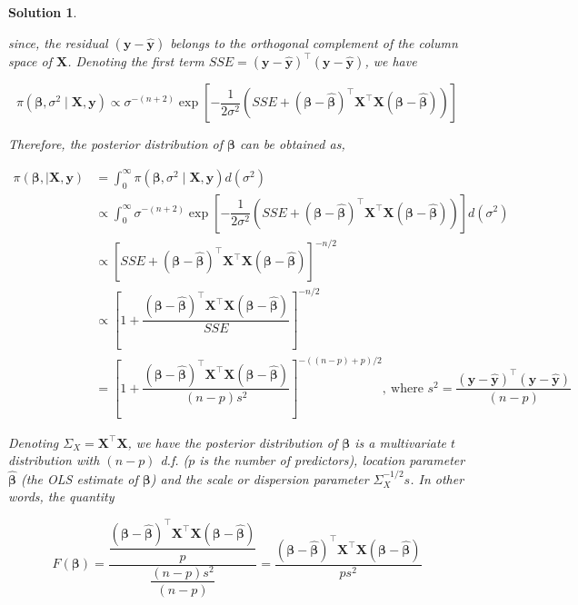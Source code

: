 \documentclass[12pt]{article}
\theoremstyle{problemstyle}
\newtheorem*{solution*}{Solution}
\newcommand{\bb}[1]{\boldsymbol{#1}}
\newcommand{\transpose}{^\intercal}
\begin{document}
\begin{solution*}
\begin{enumerate}
        since, the residual $(\bb{y} - \widehat{\bb{y}})$ belongs to the orthogonal complement of the column space of $\bb{X}$. Denoting the first term $SSE = (\bb{y} - \widehat{\bb{y}})\transpose (\bb{y} - \widehat{\bb{y}})$, we have 

        $$
        \pi(\bb{\beta}, \sigma^2 \mid \bb{X}, \bb{y}) \propto \sigma^{-(n+2)} \exp\left[ -\dfrac{1}{2\sigma^2}  (SSE + (\bb{\beta} - \widehat{\bb{\beta}})\transpose \bb{X}\transpose \bb{X} (\bb{\beta} - \widehat{\bb{\beta}}))  \right]
        $$

        Therefore, the posterior distribution of $\bb{\beta}$ can be obtained as,

        \begin{align*}
            \pi(\bb{\beta}, \mid \bb{X}, \bb{y})
            & = \int_0^\infty \pi(\bb{\beta}, \sigma^2 \mid \bb{X}, \bb{y}) d(\sigma^2)\\
            & \propto \int_0^\infty \sigma^{-(n+2)} \exp\left[ -\dfrac{1}{2\sigma^2} (SSE + (\bb{\beta} - \widehat{\bb{\beta}})\transpose \bb{X}\transpose \bb{X} (\bb{\beta} - \widehat{\bb{\beta}}))  \right] d(\sigma^2)\\
            & \propto \left[ SSE + (\bb{\beta} - \widehat{\bb{\beta}})\transpose \bb{X}\transpose \bb{X} (\bb{\beta} - \widehat{\bb{\beta}}) \right]^{-n/2}\\
            & \propto \left[ 1 + \dfrac{(\bb{\beta} - \widehat{\bb{\beta}})\transpose \bb{X}\transpose \bb{X} (\bb{\beta} - \widehat{\bb{\beta}})}{SSE} \right]^{-n/2}\\
            & = \left[ 1 + \dfrac{(\bb{\beta} - \widehat{\bb{\beta}})\transpose \bb{X}\transpose \bb{X} (\bb{\beta} - \widehat{\bb{\beta}})}{(n-p)s^2} \right]^{-((n-p)+p)/2}, \ \text{where } s^2 = \dfrac{(\bb{y} - \widehat{\bb{y}})\transpose (\bb{y} - \widehat{\bb{y}})}{(n-p)}
        \end{align*}

        Denoting $\Sigma_X = \bb{X}\transpose \bb{X}$, we have the posterior distribution of $\bb{\beta}$ is a multivariate $t$ distribution with $(n-p)$ d.f. ($p$ is the number of predictors), location parameter $\widehat{\bb{\beta}}$ (the OLS estimate of $\bb{\beta}$) and the scale or dispersion parameter $\Sigma_X^{-1/2}s$. In other words, the quantity

        $$
        F(\bb{\beta}) = \dfrac{\dfrac{(\bb{\beta} - \widehat{\bb{\beta}})\transpose \bb{X}\transpose \bb{X} (\bb{\beta} - \widehat{\bb{\beta}})}{p}}{\dfrac{(n-p)s^2}{(n-p)}} = \dfrac{(\bb{\beta} - \widehat{\bb{\beta}})\transpose \bb{X}\transpose \bb{X} (\bb{\beta} - \widehat{\bb{\beta}})}{ps^2}
        $$


\end{enumerate}
\end{solution*}
\end{document}

